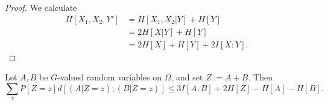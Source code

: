 \begin{proof}  We calculate
  \begin{equation}
  \begin{split} H[X_1, X_2, Y'] &= H[X_1,X_2|Y] + H[Y] \\
    &= 2 H[X|Y] + H[Y] \\
    &= 2 H[X] + H[Y] + 2 I[X:Y].
  \end{split}  \end{equation}
\end{proof}


\begin{lemma}\label{lem-bsg}
  Let $A,B$ be $G$-valued random variables on $\Omega$, and set $Z := A+B$.
Then
\begin{equation}\label{2-bsg-takeaway} \sum_{z} P[Z=z] d[(A | Z = z); (B | Z = z)] \leq 3 I[A:B] + 2 H[Z] - H[A] - H[B]. \end{equation}
\end{lemma}


